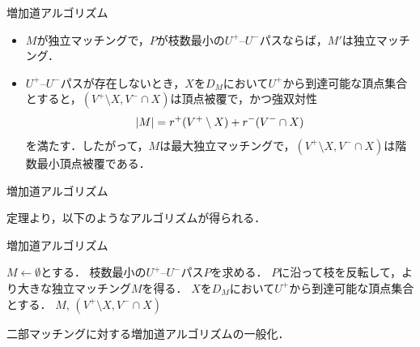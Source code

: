 \documentclass[14pt,aspectratio=169,xcolor=dvipsnames,table,onlytextwidth,dvipdfmx]{beamer}
\begin{document}
\begin{frame}{増加道アルゴリズム}
    \begin{theorem}
        \begin{itemize}
            \item $M$が独立マッチングで，$P$が\alert{枝数最小の}$U^+$--$U^-$パスならば，$M'$は独立マッチング．
            \item $U^+$--$U^-$パスが存在しないとき，$X$を$D_M$において$U^+$から到達可能な頂点集合とすると，$(V^+ \setminus X, V^- \cap X)$は頂点被覆で，かつ強双対性
        \[
            \lvert M\rvert = r^+(V^+ \setminus X) + r^-(V^- \cap X)
        \]
        を満たす．したがって，$M$は最大独立マッチングで，$(V^+ \setminus X, V^- \cap X)$は階数最小頂点被覆である．
        \end{itemize}
    \end{theorem}
\end{frame}

\begin{frame}{増加道アルゴリズム}

    定理より，以下のようなアルゴリズムが得られる．

    \begin{block}{増加道アルゴリズム}
        \begin{algorithmic}[1]
            \STATE $M \gets \emptyset$とする．
                \STATE 枝数最小の$U^+$--$U^-$パス$P$を求める． 
                \STATE $P$に沿って枝を反転して，より大きな独立マッチング$M$を得る．
            \ENDWHILE
            \STATE $X$を$D_M$において$U^+$から到達可能な頂点集合とする．
            \RETURN $M$, $(V^+ \setminus X, V^- \cap X)$
        \end{algorithmic} 
    \end{block}

    {\footnotesize 二部マッチングに対する増加道アルゴリズムの一般化．}
\end{frame}
\end{document}
